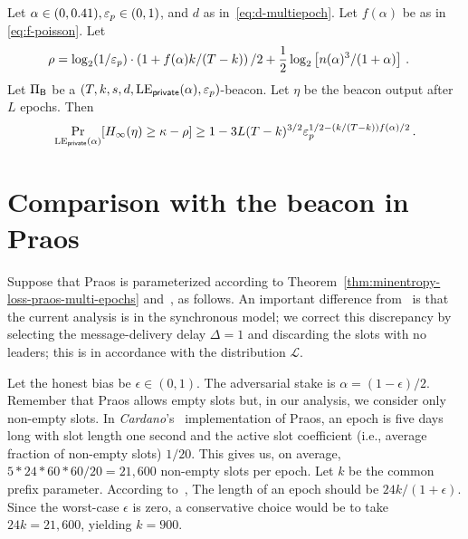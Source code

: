 \begin{theorem}\label{thm:beacon-poisson-multi-epoch}
  Let $\alpha \in (0, 0.41), \mathsf{\varepsilon}_p \in (0,1)$, 
  and $d$ as in~\eqref{eq:d-multiepoch}. 
  Let $f(\alpha)$ be as in \eqref{eq:f-poisson}.
  Let
  \begin{align}
      \rho&= \log_2(1/\mathsf{\varepsilon}_p) \cdot \left(1 + f(\alpha) k/(T-k) \right)/2
        + \frac{1}{2} \log_2 \left[ n(\alpha)^3 /(1+\alpha) \right] 
        \,.
        \label{eq:rho-poisson}
  \end{align}
  Let $\Pi_{\mathsf{B}}$ be a $(T,k,s,d,\mathrm{LE}_\mathsf{private}(\alpha), \mathsf{\varepsilon}_p)$-beacon.
  Let $\eta$ be the beacon output after $L$ epochs. 
  Then 
  $$
    \Pr_{\mathrm{LE}_\mathsf{private}(\alpha)}[H_\infty(\eta) \geq \kappa - \rho ] \geq 
      1 - 3 L (T - k)^{3/2} \mathsf{\varepsilon}_p^{1/2 - (k/(T-k)) f(\alpha)/2}
    \,.
  $$
\end{theorem}



\section{Comparison with the beacon in Praos}


Suppose that Praos is parameterized according to 
Theorem~\ref{thm:minentropy-loss-praos-multi-epochs} 
and~\cite[Theorem 9]{Praos}, as follows.
An important difference from~\cite[Theorem 9]{Praos} is that 
the current analysis is in the synchronous model; 
we correct this discrepancy by selecting the message-delivery delay $\Delta = 1$ 
and discarding the slots with no leaders; 
this is in accordance with the distribution $\mathcal{L}$.

Let the honest bias be $\epsilon \in (0,1)$.
The adversarial stake is $\alpha = (1-\epsilon)/2$. 
Remember that Praos allows empty slots but, 
in our analysis, we consider only non-empty slots. 
In \emph{Cardano}'s~\cite{Cardano} implementation of Praos, 
an epoch is five days long with slot length one second 
and the active slot coefficient (i.e., average fraction of non-empty slots)  $1/20$. 
This gives us, on average, $5*24*60*60/20 = 21,600$ non-empty slots per epoch.
Let $k$ be the common prefix parameter.  
According to~\cite[Corollary 3]{Praos}, 
The length of an epoch should be $24 k/(1+\epsilon)$. 
Since the worst-case $\epsilon$ is zero, 
a conservative choice would be to take $24 k = 21,600$, yielding $k = 900$. 


